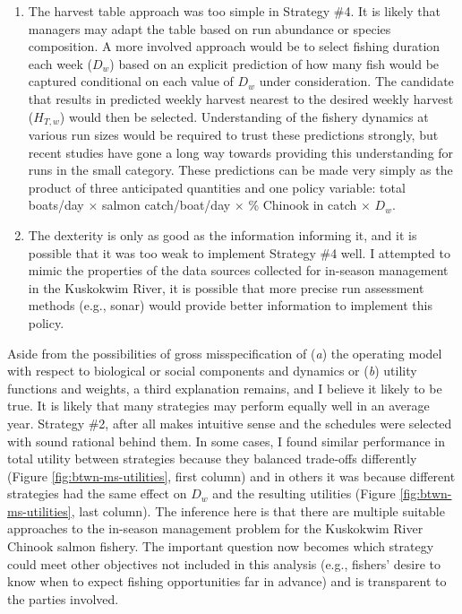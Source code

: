 \documentclass[12pt,]{book}
\theoremstyle{definition}
\theoremstyle{definition}
\theoremstyle{definition}
\theoremstyle{remark}
\begin{document}
\begin{enumerate}
\def\labelenumi{(\arabic{enumi})}
\item
  The harvest table approach was too simple in Strategy \#4. It is
  likely that managers may adapt the table based on run abundance or
  species composition. A more involved approach would be to select
  fishing duration each week (\(D_w\)) based on an explicit prediction
  of how many fish would be captured conditional on each value of
  \(D_w\) under consideration. The candidate that results in predicted
  weekly harvest nearest to the desired weekly harvest (\(H_{T,w}\))
  would then be selected. Understanding of the fishery dynamics at
  various run sizes would be required to trust these predictions
  strongly, but recent studies
  \citep{staton-coggins-2016, staton-coggins-2017, staton-2018} have
  gone a long way towards providing this understanding for runs in the
  small category. These predictions can be made very simply as the
  product of three anticipated quantities and one policy variable: total
  boats/day \(\times\) salmon catch/boat/day \(\times\) \% Chinook in
  catch \(\times\) \(D_w\).
\item
  The dexterity is only as good as the information informing it, and it
  is possible that it was too weak to implement Strategy \#4 well. I
  attempted to mimic the properties of the data sources collected for
  in-season management in the Kuskokwim River, it is possible that more
  precise run assessment methods (e.g., sonar) would provide better
  information to implement this policy.
\end{enumerate}

\noindent
Aside from the possibilities of gross misspecification of (\emph{a}) the
operating model with respect to biological or social components and
dynamics or (\emph{b}) utility functions and weights, a third
explanation remains, and I believe it likely to be true. It is likely
that many strategies may perform equally well in an average year.
Strategy \#2, after all makes intuitive sense and the schedules were
selected with sound rational behind them. In some cases, I found similar
performance in total utility between strategies because they balanced
trade-offs differently (Figure \ref{fig:btwn-ms-utilities}, first
column) and in others it was because different strategies had the same
effect on \(D_w\) and the resulting utilities (Figure
\ref{fig:btwn-ms-utilities}, last column). The inference here is that
there are multiple suitable approaches to the in-season management
problem for the Kuskokwim River Chinook salmon fishery. The important
question now becomes which strategy could meet other objectives not
included in this analysis (e.g., fishers' desire to know when to expect
fishing opportunities far in advance) and is transparent to the parties
involved.
\end{document}
